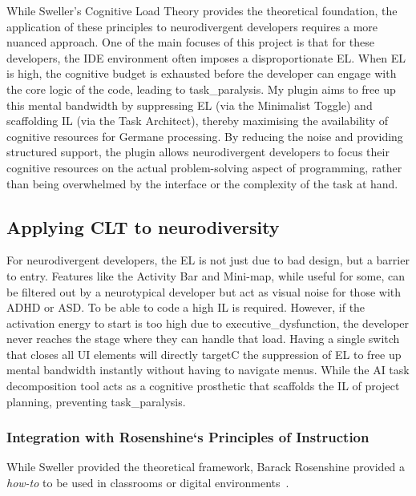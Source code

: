 While Sweller's Cognitive Load Theory provides the theoretical foundation, the application of these principles to \gls{neurodivergent} developers requires 
a more nuanced approach. One of the main focuses of this project is that for these developers, the \gls{IDE} environment often imposes a 
disproportionate \gls{EL}. When \gls{EL} is high, the cognitive budget is exhausted before the developer can engage with the core logic of the code, leading to \gls{task_paralysis}. 
My plugin aims to free up this mental bandwidth by suppressing \gls{EL} (via the Minimalist Toggle) and \gls{scaffolding} \gls{IL} (via the Task Architect),
thereby maximising the availability of cognitive resources for Germane processing. By reducing the noise and providing structured support, the plugin allows \gls{neurodivergent} developers to focus
their cognitive resources on the actual problem-solving aspect of programming, rather than being overwhelmed by the interface or the complexity of the task at hand.

\subsection{Applying CLT to \Gls{neurodiversity}}
For \gls{neurodivergent} developers, the \gls{EL} is not just due to bad design, but a barrier to entry. Features like the Activity Bar and Mini-map, while useful for some, can
be filtered out by a neurotypical developer but act as visual noise for those with \gls{ADHD} or \gls{ASD}.
To be able to code a high \gls{IL} is required. However, if the activation energy to start is too high due to \gls{executive_dysfunction}, the developer 
never reaches the stage where they can handle that load.
Having a single switch that closes all UI elements will directly targetC the suppression of \gls{EL} to free up mental bandwidth instantly without having to navigate menus.
While the \gls{AI} task decomposition tool acts as a cognitive prosthetic that scaffolds the \gls{IL} of project planning, preventing \gls{task_paralysis}.


\subsubsection{Integration with Rosenshine`s Principles of Instruction}

While Sweller provided the theoretical framework, Barack Rosenshine provided a \textit{how-to} to be used in classrooms or digital 
environments~\cite{rosenshine2012principles}. 

